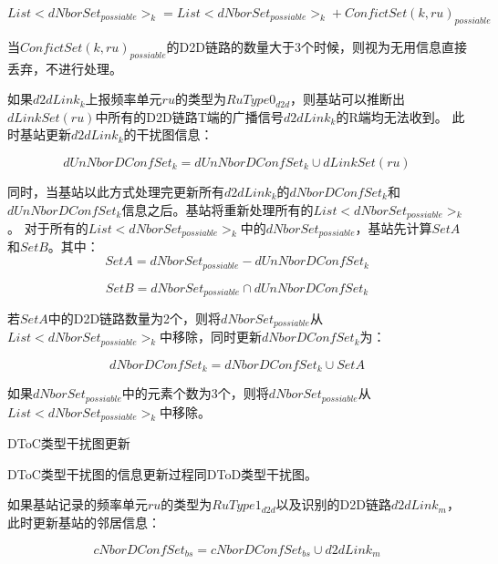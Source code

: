 \documentclass[figurelist,tablelist,algorithmlist,nomlist,masters]{seuthesix}
\begin{document}
\begin{enumerate}
	\begin{equation}\label{eq2.1}
	List < dNborSe{t_{possiable}}{ > _k} = List < dNborSe{t_{possiable}}{ > _k} + ConfictSet{(k,ru)_{possiable}}
	\end{equation}
	
	当$ConfictSet{(k,ru)_{possiable}}$的D2D链路的数量大于3个时候，则视为无用信息直接丢弃，不进行处理。
	
	
	如果$d2dLin{k_k}$上报频率单元$ru$的类型为$RuType{0_{d2d}}$，则基站可以推断出$dLinkSet(ru)$中所有的D2D链路T端的广播信号$d2dLin{k_k}$的R端均无法收到。
	此时基站更新$d2dLin{k_k}$的干扰图信息：
	
	\begin{equation}\label{eq2.1}
	dUnNborDConfSe{t_k} = dUnNborDConfSe{t_k} \cup dLinkSet(ru)
	\end{equation}
	
	同时，当基站以此方式处理完更新所有$d2dLin{k_k}$的$dNborDConfSe{t_k}$和$dUnNborDConfSe{t_k}$信息之后。基站将重新处理所有的$List < dNborSe{t_{possiable}}{ > _k}$。
	对于所有的$List < dNborSe{t_{possiable}}{ > _k}$中的$dNborSe{t_{possiable}}$，基站先计算$SetA$和$SetB$。其中：
	\begin{equation}\label{eq2.1}
	SetA = dNborSe{t_{possiable}} - dUnNborDConfSe{t_k}
	\end{equation}
	
	\begin{equation}\label{eq2.1}
	SetB = dNborSe{t_{possiable}} \cap dUnNborDConfSe{t_k}
	\end{equation}
	
	若$SetA$中的D2D链路数量为2个，则将$dNborSe{t_{possiable}}$从$List < dNborSe{t_{possiable}}{ > _k}$中移除，同时更新$dNborDConfSe{t_k}$为：
	
	\begin{equation}\label{eq2.1}
	dNborDConfSe{t_k} = dNborDConfSe{t_k} \cup SetA
	\end{equation}
	
	如果$dNborSe{t_{possiable}}$中的元素个数为3个，则将$dNborSe{t_{possiable}}$从$List < dNborSe{t_{possiable}}{ > _k}$中移除。  
	
	
	DToC类型干扰图更新
	
	DToC类型干扰图的信息更新过程同DToD类型干扰图。
	
	如果基站记录的频率单元$ru$的类型为$RuType{1_{d2d}}$以及识别的D2D链路$d2dLin{k_m}$，此时更新基站的邻居信息：
	
	\begin{equation}\label{eq2.1}
	cNborDConfSe{t_{bs}} = cNborDConfSe{t_{bs}} \cup d2dLin{k_m}
	\end{equation}
	

\end{enumerate}
\end{document}

